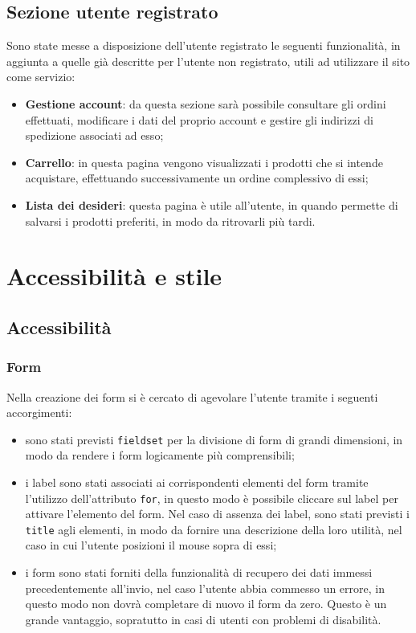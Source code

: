 	\subsection{Sezione utente registrato}
	Sono state messe a disposizione dell'utente registrato le seguenti funzionalità, in aggiunta a quelle già descritte per l'utente non registrato, utili ad utilizzare il sito come servizio:
	\begin{itemize}
		\item \textbf{Gestione account}: da questa sezione sarà possibile consultare gli ordini effettuati, modificare i dati del proprio account e gestire gli indirizzi di spedizione associati ad esso;
		\item \textbf{Carrello}: in questa pagina vengono visualizzati i prodotti che si intende acquistare, effettuando successivamente un ordine complessivo di essi;
		\item \textbf{Lista dei desideri}: questa pagina è utile all'utente, in quando permette di salvarsi i prodotti preferiti, in modo da ritrovarli più tardi.
	\end{itemize}

\section{Accessibilità e stile} %
	\subsection{Accessibilità}
	
		\subsubsection{Form}
		Nella creazione dei form si è cercato di agevolare l'utente tramite i seguenti accorgimenti:
		\begin{itemize}
			\item sono stati previsti \texttt{fieldset} per la divisione di form di grandi dimensioni, in modo da rendere i form logicamente più comprensibili;
			\item i label sono stati associati ai corrispondenti elementi del form tramite l'utilizzo dell'attributo \texttt{for}, in questo modo è possibile cliccare sul label per attivare l'elemento del form. Nel caso di assenza dei label, sono stati previsti i \texttt{title} agli elementi, in modo da fornire una descrizione della loro utilità, nel caso in cui l'utente posizioni il mouse sopra di essi;
			\item i form sono stati forniti della funzionalità di recupero dei dati immessi precedentemente all'invio, nel caso l'utente abbia commesso un errore, in questo modo non dovrà completare di nuovo il form da zero. Questo è un grande vantaggio, sopratutto in casi di utenti con problemi di disabilità.
		\end{itemize}
	
